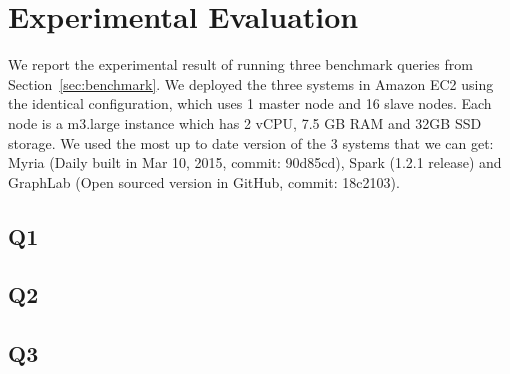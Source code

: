 \section{Experimental Evaluation}

We report the experimental result of running three benchmark queries from 
Section~\ref{sec:benchmark}. We deployed the three systems in Amazon EC2 using 
the identical configuration, which uses 1 master node and 16 slave nodes.
Each node is a m3.large instance which has 2 vCPU, 7.5 GB RAM and 32GB SSD 
storage. We used the most up to date version of the 3 systems that we can get:
Myria (Daily built in Mar 10, 2015, commit: 90d85cd), Spark (1.2.1 release) and
GraphLab (Open sourced version in GitHub, commit: 18c2103).

\subsection{Q1}
\subsection{Q2}
\subsection{Q3}

